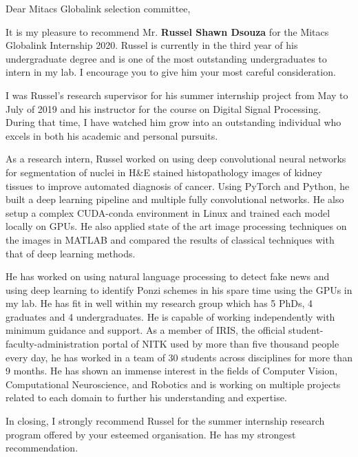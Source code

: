 \documentclass[12pt]{article}
\begin{document}
  \noindent
  Dear Mitacs Globalink selection committee,

  \bigskip
  \noindent
  It is my pleasure to recommend Mr. \textbf{Russel Shawn Dsouza} for the Mitacs Globalink Internship 2020. Russel is currently in the third year of his undergraduate degree and is one of the most outstanding undergraduates to intern in my lab. I encourage you to give him your most careful consideration.

  \medskip
  \noindent
  I was Russel's research supervisor for his summer internship project from May to July of 2019 and his instructor for the course on Digital Signal Processing.
  During that time, I have watched him grow into an outstanding individual who excels in both his academic and personal pursuits.

  \medskip
  \noindent
  As a research intern, Russel worked on using deep convolutional neural networks for segmentation of nuclei in H\&E stained histopathology images of kidney tissues to improve automated diagnosis of cancer.
  Using PyTorch and Python, he built a deep learning pipeline and multiple fully convolutional networks. He also setup a complex CUDA-conda environment in Linux and trained each model locally on GPUs.
  He also applied state of the art image processing techniques on the images in MATLAB and compared the results of classical techniques with that of deep learning methods.

  \medskip
  \noindent
  He has worked on using natural language processing to detect fake news and using deep learning to identify Ponzi schemes in his spare time using the GPUs in my lab.
  He has fit in well within my research group which has 5 PhDs, 4 graduates and 4 undergraduates.
  He is capable of working independently with minimum guidance and support. 
  As a member of IRIS, the official student-faculty-administration portal of NITK used by more than five thousand people every day, he has worked in a team of 30 students across disciplines for more than 9 months.
  He has shown an immense interest in the fields of Computer Vision, Computational Neuroscience, and Robotics and is working on multiple projects related to each domain to further his understanding and expertise.

  \medskip
  \noindent
  In closing, I strongly recommend Russel for the summer internship research program offered by your esteemed organisation. He has my strongest recommendation.
\end{document}
